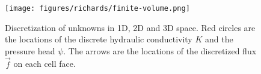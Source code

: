 \begin{figure}[ht]
\begin{center}
\texttt{[image: figures/richards/finite-volume.png]}
\end{center}
\caption{Discretization of unknowns in 1D, 2D and 3D space. Red circles are the locations of the discrete hydraulic conductivity $K$ and the pressure head $\psi$.
The arrows are the locations of the discretized flux $\vec f$ on each cell face.}
\label{fig:richards-finite-volume}
\end{figure}
